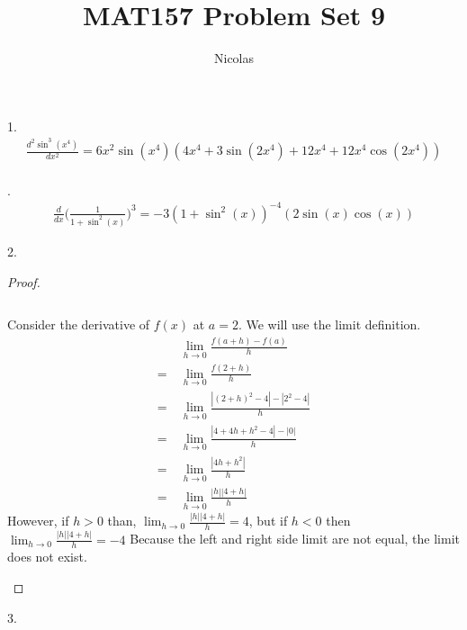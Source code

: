 \documentclass[11pt]{article}
\title{MAT157 Problem Set 9}
\author{Nicolas}
\newenvironment{myproof}
{\begin{proof} \begin{adjustwidth}{3em}{0pt}$ $\par\nobreak\ignorespaces}
{\end{adjustwidth} \end{proof}}
\begin{document}
\maketitle
\begin{flushleft}

1. 
\begin{align*}
\frac{d^2\sin^3(x^4)}{dx^2} = 6x^2\sin(x^4)(4x^4+3\sin(2x^4)+12x^4+12x^4\cos(2x^4))
\end{align*} \\
.
\begin{align*}
\frac{d}{dx}\Big(\frac{1}{1+\sin^2(x)}\Big)^3 = -3(1+\sin^2(x))^{-4}(2\sin(x)\cos(x))
\end{align*}

\newpage

2.

\begin{myproof}

Consider the derivative of $f(x)$ at $a = 2$. We will use the limit definition.
\begin{align*}
& \ \lim_{h \to 0}\frac{f(a+h)-f(a)}{h} \\
= & \ \lim_{h \to 0}\frac{f(2+h)}{h} \\
= & \ \lim_{h \to 0}\frac{|(2+h)^2 - 4| - |2^2 -4|}{h} \\
= & \ \lim_{h \to 0}\frac{|4 +4h + h^2 - 4| - |0|}{h} \\
= & \ \lim_{h \to 0}\frac{|4h+h^2|}{h} \\
= & \ \lim_{h \to 0}\frac{|h||4+h|}{h}
\end{align*}
However, if $h>0$ than, $\lim_{h \to 0}\frac{|h||4+h|}{h} = 4$, but if $h<0$ then $\lim_{h \to 0}\frac{|h||4+h|}{h} = -4$ Because the left and right side limit are not equal, the limit does not exist.

\end{myproof}

\newpage

3.


\end{flushleft}
\end{document}

